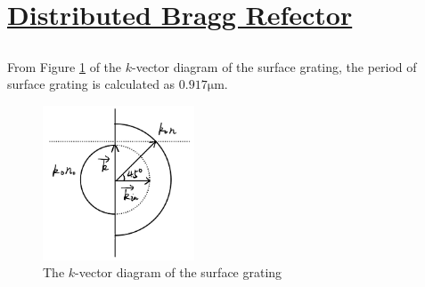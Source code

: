 \documentclass[fontsize=11pt]{scrartcl}
\begin{document}
\section{\uline{Distributed Bragg Refector}}
\subsection{}
From Figure \ref{fig1.1} of the $k$-vector diagram of the surface grating, 
the period of surface grating is calculated as $0.917\mathrm{\mu m}$.
\begin{figure}[H]
    \centering
     \includegraphics[width=0.4\textwidth]{img/fig1.1.png}
     \caption{The $k$-vector diagram of the surface grating}
     \label{fig1.1}
\end{figure}
\end{document}
